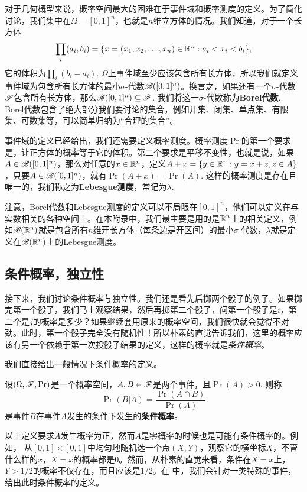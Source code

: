 对于几何概型来说，概率空间最大的困难在于事件域和概率测度的定义。为了简化讨论，我们集中在$\Omega=[0,1]^n$，也就是$n$维立方体的情况。我们知道，对于一个长方体
\[\prod_i(a_i,b_i)=\{x=(x_1,x_2,\ldots,x_n)\in\mathbb{R}^n:a_i<x_i<b_i\},\]
它的体积为$\prod_i(b_i-a_i)$. $\Omega$上事件域至少应该包含所有长方体，所以我们就定义事件域为包含所有长方体的最小$\sigma$-代数$\mathscr{B}([0,1]^n)$。换言之，如果还有一个$\sigma$-代数$\mathscr{F}$包含所有长方体，那么$\mathscr{B}([0,1]^n)\subseteq\mathscr{F}$. 我们将这一$\sigma$-代数称为\textbf{Borel代数}. Borel代数包含了绝大部分我们要讨论的集合，例如开集、闭集、单点集、有限集、可数集等，可以简单归纳为“合理的集合”。

事件域的定义已经给出，我们还需要定义概率测度。概率测度$\Pr$的第一个要求是，让正方体的概率等于它的体积。第二个要求是平移不变性，也就是说，如果$A\in\mathscr{B}([0,1]^n)$，那么对任意的$x\in\mathbb{R}^n$，定义$A+x=\{y\in\mathbb{R}^n:y=x+z,z\in A\}$，只要$A\in\mathscr{B}([0,1]^n)$，就有$\Pr(A+x)=\Pr(A)$. 这样的概率测度是存在且唯一的，我们称之为\textbf{Lebesgue测度}，常记为$\lambda$.

注意，Borel代数和Lebesgue测度的定义可以不局限在$[0,1]^n$，他们可以定义在与实数相关的各种空间上。在本附录中，我们最主要是用的是$\mathbb{R}^n$上的相关定义，例如$\mathscr{B}(\mathbb{R}^n)$就是包含所有$n$维开长方体（每条边是开区间）的最小$\sigma$-代数，$\lambda$就是定义在$\mathscr{B}(\mathbb{R}^n)$上的Lebesgue测度。

\subsection{条件概率，独立性}
接下来，我们讨论条件概率与独立性。我们还是看先后掷两个骰子的例子。如果掷完第一个骰子，我们马上观察结果，然后再掷第二个骰子，问第一个骰子是$i$，第二个是$j$的概率是多少？如果继续套用原来的概率空间，我们很快就会觉得不对劲。此时，第一个骰子完全没有随机性！所以朴素的直觉告诉我们，这里的概率应该有另一个依赖于第一次投骰子结果的定义，这样的概率就是\emph{条件概率}。

我们直接给出一般情况下条件概率的定义。

\begin{definition}[条件概率]
设$(\Omega,\mathscr{F},\Pr)$是一个概率空间，$A,B\in\mathscr{F}$是两个事件，且$\Pr(A)>0$. 则称
\[
    \Pr(B|A) = \frac{\Pr(A\cap B)}{\Pr(A)}
\]
是事件$B$在事件$A$发生的条件下发生的\textbf{条件概率}。
\end{definition}

以上定义要求$A$发生概率为正，然而$A$是零概率的时候也是可能有条件概率的。例如，
从$[0,1]\times[0,1]$中均匀地随机选一个点$(X,Y)$，观察它的横坐标$X$，不管什么样的$x$，$X=x$的概率都是$0$。然而，从朴素的直觉来看，条件在$X=x$上，$Y>1/2$的概率不仅存在，而且应该是$1/2$。在 中，我们会针对一类特殊的事件，给出此时条件概率的定义。

